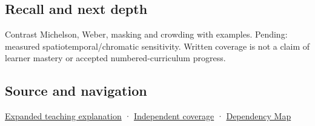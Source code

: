 \subsection{Recall and next depth}\label{appendix-b3aa9e8e01ad-recall-and-next-depth}

Contrast Michelson, Weber, masking and crowding with examples. Pending: measured spatiotemporal/chromatic sensitivity. Written coverage is not a claim of learner mastery or accepted numbered-curriculum progress.

\subsection{Source and navigation}\label{appendix-b3aa9e8e01ad-source-and-navigation}

\hyperref[04-visual-computing-ii-ch042-visibility-is-about-contrast-conditions-and-tasks]{Expanded teaching explanation} · \hyperref[appendix-fd090d982a15-xr01---independent-seeing-and-representation-source]{Independent coverage} · \hyperref[appendix-4ad47bdd269a]{Dependency Map}
